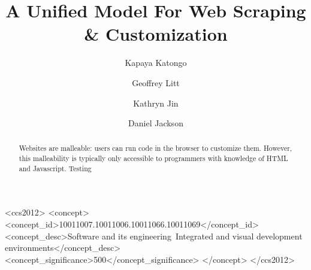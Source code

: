 \documentclass[sigconf,10pt]{acmart}
\begin{document}
\title{A Unified Model For Web Scraping \& Customization}


\author{Kapaya Katongo}

\author{Geoffrey Litt}

\author{Kathryn Jin}

\author{Daniel Jackson}


\begin{abstract}
  Websites are malleable: users can run code in the browser to customize
  them. However, this malleability is typically only accessible to
  programmers with knowledge of HTML and Javascript. Testing
\end{abstract}

\begin{CCSXML}
<ccs2012>
<concept>
<concept_id>10011007.10011006.10011066.10011069</concept_id>
<concept_desc>Software and its engineering~Integrated and visual development environments</concept_desc>
<concept_significance>500</concept_significance>
</concept>
</ccs2012>
\end{CCSXML}
\end{document}
